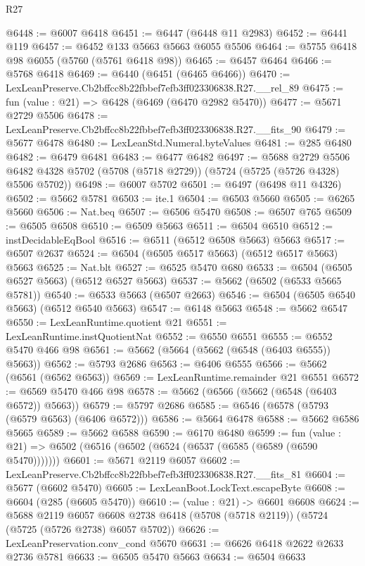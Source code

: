 \begin{lexlean}{R27}
\begin{coremodule}
@6448 := @6007 @6418
@6451 := @6447 (@6448 @11 @2983)
@6452 := @6441 @119
@6457 := @6452 @133 @5663 @5663 @6055 @5506
@6464 := @5755 @6418 @98 @6055 (@5760 (@5761 @6418 @98))
@6465 := @6457 @6464
@6466 := @5768 @6418
@6469 := @6440 (@6451 (@6465 @6466))
@6470 := LexLeanPreserve.Cb2bffcc8b22fbbef7efb3ff023306838.R27.__rel_89
@6475 := fun (value : @21) => @6428 (@6469 (@6470 @2982 @5470))
@6477 := @5671 @2729 @5506
@6478 := LexLeanPreserve.Cb2bffcc8b22fbbef7efb3ff023306838.R27.__fits_90
@6479 := @5677 @6478
@6480 := LexLeanStd.Numeral.byteValues
@6481 := @285 @6480
@6482 := @6479 @6481
@6483 := @6477 @6482
@6497 := @5688
    @2729
    @5506
    @6482
    @4328
    @5702
    (@5708 (@5718 @2729))
    (@5724 (@5725 (@5726 @4328) @5506 @5702))
@6498 := @6007 @5702
@6501 := @6497 (@6498 @11 @4326)
@6502 := @5662 @5781
@6503 := ite.{1}
@6504 := @6503 @5660
@6505 := @6265 @5660
@6506 := Nat.beq
@6507 := @6506 @5470
@6508 := @6507 @765
@6509 := @6505 @6508
@6510 := @6509 @5663
@6511 := @6504 @6510
@6512 := instDecidableEqBool
@6516 := @6511 (@6512 @6508 @5663) @5663
@6517 := @6507 @2637
@6524 := @6504 (@6505 @6517 @5663) (@6512 @6517 @5663) @5663
@6525 := Nat.blt
@6527 := @6525 @5470 @680
@6533 := @6504 (@6505 @6527 @5663) (@6512 @6527 @5663)
@6537 := @5662 (@6502 (@6533 @5665 @5781))
@6540 := @6533 @5663 (@6507 @2663)
@6546 := @6504 (@6505 @6540 @5663) (@6512 @6540 @5663)
@6547 := @6148 @5663
@6548 := @5662 @6547
@6550 := LexLeanRuntime.quotient @21
@6551 := LexLeanRuntime.instQuotientNat
@6552 := @6550 @6551
@6555 := @6552 @5470 @466 @98
@6561 := @5662 (@5664 (@5662 (@6548 (@6403 @6555)) @5663))
@6562 := @5793 @2686
@6563 := @6406 @6555
@6566 := @5662 (@6561 (@6562 @6563))
@6569 := LexLeanRuntime.remainder @21 @6551
@6572 := @6569 @5470 @466 @98
@6578 := @5662 (@6566 (@5662 (@6548 (@6403 @6572)) @5663))
@6579 := @5797 @2686
@6585 := @6546 (@6578 (@5793 (@6579 @6563) (@6406 @6572)))
@6586 := @5664 @6478
@6588 := @5662 @6586 @5665
@6589 := @5662 @6588
@6590 := @6170 @6480
@6599 := fun (value : @21) => @6502 (@6516 (@6502 (@6524 (@6537 (@6585 (@6589 (@6590 @5470)))))))
@6601 := @5671 @2119 @6057
@6602 := LexLeanPreserve.Cb2bffcc8b22fbbef7efb3ff023306838.R27.__fits_81
@6604 := @5677 (@6602 @5470)
@6605 := LexLeanBoot.LockText.escapeByte
@6608 := @6604 (@285 (@6605 @5470))
@6610 := (value : @21) -> @6601 @6608
@6624 := @5688
    @2119
    @6057
    @6608
    @2738
    @6418
    (@5708 (@5718 @2119))
    (@5724 (@5725 (@5726 @2738) @6057 @5702))
@6626 := LexLeanPreservation.conv_cond @5670
@6631 := @6626 @6418 @2622 @2633 @2736 @5781
@6633 := @6505 @5470 @5663
@6634 := @6504 @6633

\end{coremodule}
\end{lexlean}
